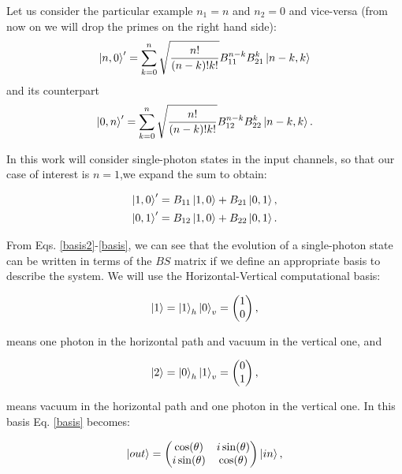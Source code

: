 \documentclass[12pt]{book}
\begin{document}
Let us consider the particular example  $n_{1}=n$ and $n_{2}=0$  and vice-versa (from now on we will drop the primes on the right hand side):
\begin{equation}
 \ket{n,0}'=\sum^{n}_{k=0} \sqrt{\frac{n!}{(n-k)!k!}} B_{11}^{n-k} B_{21}^{k} \ket{n-k,k}
\end{equation}
and its counterpart
\begin{equation}
     \ket{0,n}'=\sum^{n}_{k=0} \sqrt{\frac{n!}{(n-k)!k!}} B_{12}^{n-k} B_{22}^{k} \ket{n-k,k}.
\end{equation}

In this work will consider single-photon states in the input channels, so that our case of interest is $n=1$,we expand the sum to obtain:

\begin{align}
\ket{1,0}'=B_{11}\ket{1,0}+B_{21}\ket{0,1},\label{basis2} \\
\ket{0,1}'=B_{12}\ket{1,0}+B_{22}\ket{0,1}.
\label{basis}
\end{align}


From Eqs. \ref{basis2}-\ref{basis}, we can see that the evolution of a single-photon state can be written in terms of the $BS$ matrix if we define an appropriate basis to describe the system. We will use the Horizontal-Vertical computational basis:

 \begin{equation}
 \ket{1}=\ket{1}_{h}\ket{0}_{v}=\begin{pmatrix} 1 \\0\end{pmatrix},
 \end{equation}

 means one photon in the horizontal path and vacuum in the vertical one, and
 
 \begin{equation}
 \ket{2}=\ket{0}_{h}\ket{1}_{v}=\begin{pmatrix} 0 \\1 \end{pmatrix},
 \end{equation}
 
means vacuum  in the horizontal path and one photon in the vertical one. In this basis Eq. \ref{basis} becomes:

\begin{equation}
\ket{out}=\begin{pmatrix} \cos(\theta) & i \sin(\theta) \\ i \sin(\theta) & \cos(\theta) \end{pmatrix} \ket{in},
\end{equation}
\end{document}

